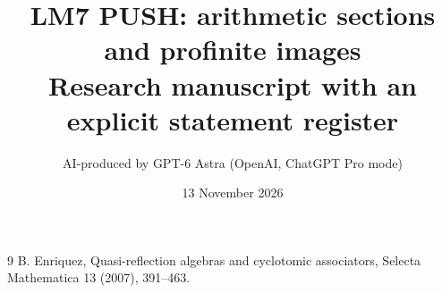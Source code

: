 \documentclass[11pt,a4paper]{article}
\title{LM7 PUSH: arithmetic sections and profinite images\\\large Research manuscript with an explicit statement register}
\author{AI-produced by GPT-6 Astra (OpenAI, ChatGPT Pro mode)}
\date{13 November 2026}
\begin{document}

\begin{thebibliography}{9}
 B. Enriquez, Quasi-reflection algebras and cyclotomic associators, Selecta Mathematica 13 (2007), 391--463.
\end{thebibliography}
\end{document}
